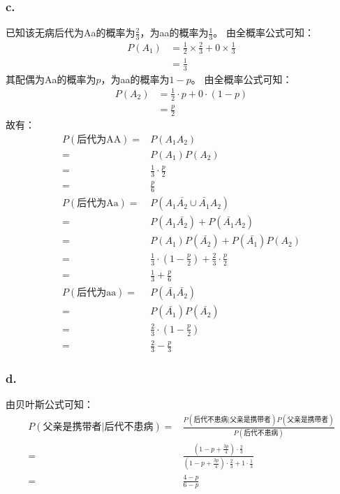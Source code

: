 \documentclass[a4paper,12pt]{ctexart}
\begin{document}
\subsubsection*{c.}
已知该无病后代为Aa的概率为$\frac{2}{3}$，为aa的概率为$\frac{1}{3}$。
由全概率公式可知：
\begin{align*}
	P(A_1) &= \frac{1}{2} \times \frac{2}{3} + 0 \times \frac{1}{3}\\
	&= \frac{1}{3}
\end{align*}
其配偶为Aa的概率为$p$，为aa的概率为$1-p$。
由全概率公式可知：
\begin{align*}
	P(A_2) &= \frac{1}{2} \cdot p + 0 \cdot (1-p)\\
	&= \frac{p}{2}
\end{align*}
故有：
\begin{align*}
	P(\text{后代为AA}) =& P(A_1A_2)\\
	=& P(A_1)P(A_2)\\
	=& \frac{1}{3} \cdot \frac{p}{2}\\
	=& \frac{p}{6}\\
	P(\text{后代为Aa}) =& P(A_1\bar{A_2} \cup \bar{A_1}A_2)\\
	=& P(A_1\bar{A_2}) + P(\bar{A_1}A_2)\\
	=& P(A_1)P(\bar{A_2}) + P(\bar{A_1})P(A_2)\\
	=& \frac{1}{3} \cdot (1 - \frac{p}{2}) + \frac{2}{3} \cdot \frac{p}{2}\\
	=& \frac{1}{3} + \frac{p}{6}\\
	P(\text{后代为aa}) =& P(\bar{A_1}\bar{A_2})\\
	=& P(\bar{A_1})P(\bar{A_2})\\
	=& \frac{2}{3} \cdot (1 - \frac{p}{2})\\
	=& \frac{2}{3} - \frac{p}{3}
\end{align*}

\subsubsection*{d.}
由贝叶斯公式可知：
\begin{align*}
	P(\text{父亲是携带者}|\text{后代不患病}) =& \frac{P(\text{后代不患病}|\text{父亲是携带者})P(\text{父亲是携带者})}{P(\text{后代不患病})}\\
	=& \frac{(1-p + \frac{3p}{4}) \cdot \frac{2}{3}}{(1-p + \frac{3p}{4}) \cdot \frac{2}{3} + 1 \cdot \frac{1}{3}}\\
	=& \frac{4-p}{6-p}
\end{align*}
\end{document}
